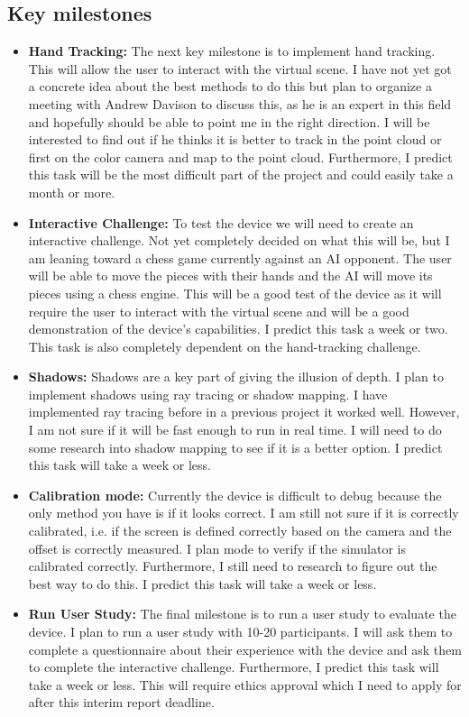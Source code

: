 \subsection{Key milestones}
\begin{itemize}
    \item \textbf{Hand Tracking:} The next key milestone is to implement hand tracking. This will allow the user to interact with the virtual scene. I have not yet got a concrete idea about the best methods to do this but plan to organize a meeting with Andrew Davison to discuss this, as he is an expert in this field and hopefully should be able to point me in the right direction. I will be interested to find out if he thinks it is better to track in the point cloud or first on the color camera and map to the point cloud. Furthermore, I predict this task will be the most difficult part of the project and could easily take a month or more.

    \item \textbf{Interactive Challenge:} To test the device we will need to create an interactive challenge. Not yet completely decided on what this will be, but I am leaning toward a chess game currently against an AI opponent. The user will be able to move the pieces with their hands and the AI will move its pieces using a chess engine. This will be a good test of the device as it will require the user to interact with the virtual scene and will be a good demonstration of the device's capabilities. I predict this task a week or two. This task is also completely dependent on the hand-tracking challenge.

    \item \textbf{Shadows:} Shadows are a key part of giving the illusion of depth. I plan to implement shadows using ray tracing or shadow mapping. I have implemented ray tracing before in a previous project it worked well. However, I am not sure if it will be fast enough to run in real time. I will need to do some research into shadow mapping to see if it is a better option. I predict this task will take a week or less.

    \item \textbf{Calibration mode:} Currently the device is difficult to debug because the only method you have is if it looks correct. I am still not sure if it is correctly calibrated, i.e. if the screen is defined correctly based on the camera and the offset is correctly measured. I plan mode to verify if the simulator is calibrated correctly. Furthermore, I still need to research to figure out the best way to do this. I predict this task will take a week or less.
    
    \item \textbf{Run User Study:} The final milestone is to run a user study to evaluate the device. I plan to run a user study with 10-20 participants. I will ask them to complete a questionnaire about their experience with the device and ask them to complete the interactive challenge. Furthermore, I predict this task will take a week or less. This will require ethics approval which I need to apply for after this interim report deadline.
\end{itemize}


